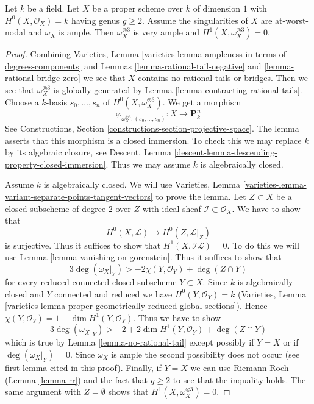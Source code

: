 \begin{lemma}
\label{lemma-tricanonical}
Let $k$ be a field. Let $X$ be a proper scheme over $k$ of dimension $1$ with
$H^0(X, \mathcal{O}_X) = k$ having genus $g \geq 2$. Assume the singularities
of $X$ are at-worst-nodal and $\omega_X$ is ample. Then
$\omega_X^{\otimes 3}$ is very ample and $H^1(X, \omega_X^{\otimes 3}) = 0$.
\end{lemma}

\begin{proof}
Combining Varieties, Lemma
\ref{varieties-lemma-ampleness-in-terms-of-degrees-components} and
Lemmas \ref{lemma-rational-tail-negative} and \ref{lemma-rational-bridge-zero}
we see that $X$ contains no rational tails or bridges.
Then we see that $\omega_X^{\otimes 3}$ is globally generated
by Lemma \ref{lemma-contracting-rational-tails}.
Choose a $k$-basis $s_0, \ldots, s_n$ of
$H^0(X, \omega_X^{\otimes 3})$. We get a morphism
$$
\varphi_{\omega_X^{\otimes 3}, (s_0, \ldots, s_n)} :
X \longrightarrow \mathbf{P}^n_k
$$
See Constructions, Section \ref{constructions-section-projective-space}.
The lemma asserts that this morphism is a closed immersion.
To check this we may replace $k$ by its algebraic closure, see
Descent, Lemma \ref{descent-lemma-descending-property-closed-immersion}.
Thus we may assume $k$ is algebraically closed.

\medskip\noindent
Assume $k$ is algebraically closed.
We will use Varieties, Lemma
\ref{varieties-lemma-variant-separate-points-tangent-vectors}
to prove the lemma.
Let $Z \subset X$ be a closed subscheme of degree $2$ over $Z$
with ideal sheaf $\mathcal{I} \subset \mathcal{O}_X$.
We have to show that
$$
H^0(X, \mathcal{L}) \to H^0(Z, \mathcal{L}|_Z)
$$
is surjective. Thus it suffices to show that
$H^1(X, \mathcal{I}\mathcal{L}) = 0$.
To do this we will use Lemma \ref{lemma-vanishing-on-gorenstein}.
Thus it suffices to show that
$$
3\deg(\omega_X|_Y) > -2\chi(Y, \mathcal{O}_Y) + \deg(Z \cap Y)
$$
for every reduced connected closed subscheme $Y \subset X$.
Since $k$ is algebraically closed and $Y$ connected and reduced
we have $H^0(Y, \mathcal{O}_Y) = k$ (Varieties, Lemma
\ref{varieties-lemma-proper-geometrically-reduced-global-sections}).
Hence $\chi(Y, \mathcal{O}_Y) = 1 - \dim H^1(Y, \mathcal{O}_Y)$.
Thus we have to show
$$
3\deg(\omega_X|_Y) > -2 + 2\dim H^1(Y, \mathcal{O}_Y) + \deg(Z \cap Y)
$$
which is true by Lemma \ref{lemma-no-rational-tail}
except possibly if $Y = X$ or if $\deg(\omega_X|_Y) = 0$.
Since $\omega_X$ is ample the second possibility does not
occur (see first lemma cited in this proof). Finally, if
$Y = X$ we can use Riemann-Roch (Lemma \ref{lemma-rr})
and the fact that $g \geq 2$ to see that the inquality holds.
The same argument with $Z = \emptyset$ shows that
$H^1(X, \omega_X^{\otimes 3}) = 0$.
\end{proof}







